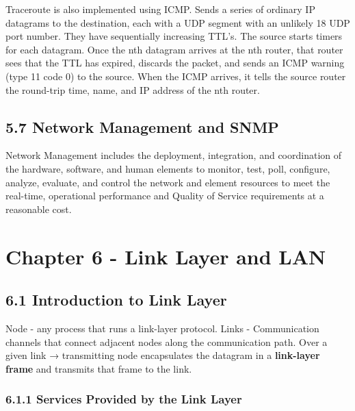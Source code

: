 \documentclass[11pt]{article}
\begin{document}
Traceroute is also implemented using ICMP. Sends a series of ordinary IP datagrams to the destination, each with a UDP segment with an unlikely 18 UDP port number. They have sequentially increasing TTL's. The source starts timers for each datagram. Once the nth datagram arrives at the nth router, that router sees that the TTL has expired, discards the packet, and sends an ICMP warning (type 11 code 0) to the source. When the ICMP arrives, it tells the source router the round-trip time, name, and IP address of the nth router.

\subsection{5.7 Network Management and SNMP}
\label{sec:orge3c3358}
Network Management includes the deployment, integration,
and coordination of the hardware, software, and human elements to monitor, test, poll, configure, analyze, evaluate, and control the network and element resources to meet the real-time, operational performance and Quality of Service requirements at a reasonable cost.

\section{Chapter 6 - Link Layer and LAN}
\label{sec:org6f7e3ed}

\subsection{6.1 Introduction to Link Layer}
\label{sec:org36ff5f0}

Node - any process that runs a link-layer protocol.
Links - Communication channels that connect adjacent nodes along the communication path.
Over a given link → transmitting node encapsulates the datagram in a \textbf{link-layer frame} and transmits that frame to the link.

\subsubsection{6.1.1 Services Provided by the Link Layer}
\label{sec:orgcfb4155}
\end{document}
